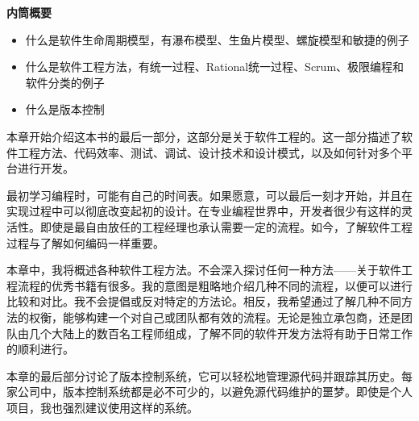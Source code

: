 \noindent
\textbf{内筒概要}

\begin{itemize}
\item
什么是软件生命周期模型，有瀑布模型、生鱼片模型、螺旋模型和敏捷的例子

\item
什么是软件工程方法，有统一过程、Rational统一过程、Scrum、极限编程和软件分类的例子

\item
什么是版本控制
\end{itemize}

本章开始介绍这本书的最后一部分，这部分是关于软件工程的。这一部分描述了软件工程方法、代码效率、测试、调试、设计技术和设计模式，以及如何针对多个平台进行开发。

最初学习编程时，可能有自己的时间表。如果愿意，可以最后一刻才开始，并且在实现过程中可以彻底改变起初的设计。在专业编程世界中，开发者很少有这样的灵活性。即使是最自由放任的工程经理也承认需要一定的流程。如今，了解软件工程过程与了解如何编码一样重要。

本章中，我将概述各种软件工程方法。不会深入探讨任何一种方法——关于软件工程流程的优秀书籍有很多。我的意图是粗略地介绍几种不同的流程，以便可以进行比较和对比。我不会提倡或反对特定的方法论。相反，我希望通过了解几种不同方法的权衡，能够构建一个对自己或团队都有效的流程。无论是独立承包商，还是团队由几个大陆上的数百名工程师组成，了解不同的软件开发方法将有助于日常工作的顺利进行。

本章的最后部分讨论了版本控制系统，它可以轻松地管理源代码并跟踪其历史。每家公司中，版本控制系统都是必不可少的，以避免源代码维护的噩梦。即使是个人项目，我也强烈建议使用这样的系统。








